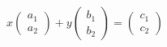 \documentclass[preview]{standalone}
\begin{document}
\begin{align*}
x \begin{pmatrix} a_1 \\ a_2 \end{pmatrix} + y \begin{pmatrix} b_1 \\ b_2 \end{pmatrix} = \begin{pmatrix} c_1 \\ c_2 \end{pmatrix}
\end{align*}
\end{document}

